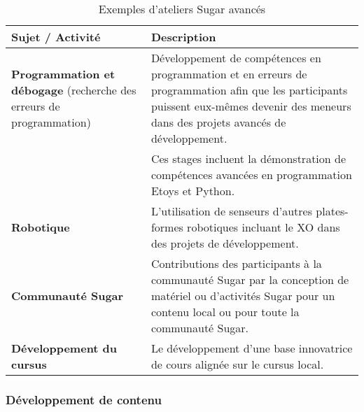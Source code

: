 \documentclass[11pt]{article}
\begin{document}
\begin{table}[htb]
\caption{Exemples d'ateliers Sugar avancés} 
\begin{center}
\begin{tabular}{|p{3.8cm}|p{11cm}|}
\hline
 Sujet / Activité                                                             &  Description                                                                                                                                                                               \\
\hline
 \textbf{Programmation et débogage} (recherche des erreurs de programmation)  &  Développement de compétences en programmation et en erreurs de programmation afin que les participants puissent eux-mêmes devenir des meneurs dans des projets avancés de développement.  \\
                                                                              &  Ces stages incluent la démonstration de compétences avancées en programmation Etoys et Python.                                                                                            \\
\hline
 \textbf{Robotique}                                                           &  L’utilisation de senseurs d’autres plates-formes robotiques incluant le XO dans des projets de développement.                                                                             \\
\hline
 \textbf{Communauté Sugar}                                                    &  Contributions des participants à la communauté Sugar par la conception de matériel ou d’activités Sugar pour un contenu local ou pour toute la communauté Sugar.                          \\
\hline
 \textbf{Développement du cursus}                                             &  Le développement d’une base innovatrice de cours alignée sur le cursus local.                                                                                                             \\
\hline
\end{tabular}
\end{center}
\end{table}
\subsubsection{Développement de contenu}
\label{sec-9-2-2}


\end{document}
